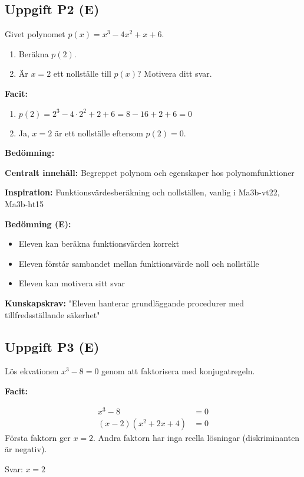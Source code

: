\documentclass[12pt]{article}
\begin{document}
\subsection*{Uppgift P2 (E)}
Givet polynomet $p(x) = x^3 - 4x^2 + x + 6$.
\begin{enumerate}[label=\alph*)]
    \item Beräkna $p(2)$.
    \item Är $x = 2$ ett nollställe till $p(x)$? Motivera ditt svar.
\end{enumerate}

\begin{facitbox}
\textbf{Facit:}

\begin{enumerate}[label=\alph*)]
    \item $p(2) = 2^3 - 4 \cdot 2^2 + 2 + 6 = 8 - 16 + 2 + 6 = 0$
    \item Ja, $x = 2$ är ett nollställe eftersom $p(2) = 0$.
\end{enumerate}
\end{facitbox}

\begin{refbox}
\textbf{Bedömning:}

\textbf{Centralt innehåll:} Begreppet polynom och egenskaper hos polynomfunktioner

\textbf{Inspiration:} Funktionsvärdesberäkning och nollställen, vanlig i Ma3b-vt22, Ma3b-ht15

\textbf{Bedömning (E):}
\begin{itemize}
    \item Eleven kan beräkna funktionsvärden korrekt
    \item Eleven förstår sambandet mellan funktionsvärde noll och nollställe
    \item Eleven kan motivera sitt svar
\end{itemize}

\textbf{Kunskapskrav:} "Eleven hanterar grundläggande procedurer med tillfredsställande säkerhet"
\end{refbox}

\subsection*{Uppgift P3 (E)}
Lös ekvationen $x^3 - 8 = 0$ genom att faktorisera med konjugatregeln.

\begin{facitbox}
\textbf{Facit:}

\begin{align*}
x^3 - 8 &= 0 \\
(x - 2)(x^2 + 2x + 4) &= 0
\end{align*}
Första faktorn ger $x = 2$. Andra faktorn har inga reella lösningar (diskriminanten är negativ).

Svar: $x = 2$
\end{facitbox}
\end{document}
